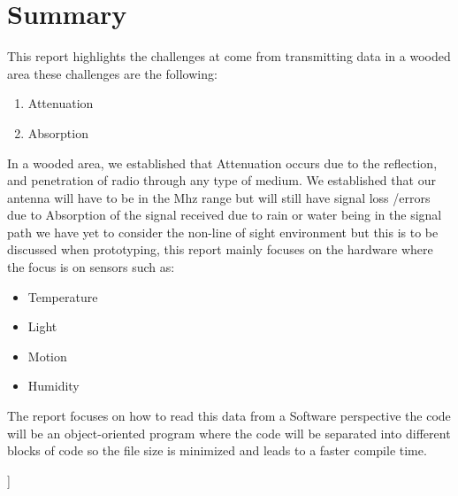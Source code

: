 \section{Summary}
This report  highlights the  challenges at come from  transmitting data in a  wooded area these challenges are  the following:
\begin{enumerate}
\item Attenuation 
\item Absorption
\end{enumerate}
In a wooded area, we established that  Attenuation occurs due to the reflection, and penetration of radio through any type of medium.
We established that our antenna will have to  be in the  Mhz range   but will still have signal loss /errors due to Absorption of  the  signal  received due  to rain or water being in the signal path
we have yet to consider the non-line of sight environment but this  is  to be  discussed when prototyping, this report mainly focuses on the hardware where the  focus is on  sensors such as:
\begin{itemize}
\item Temperature
\item Light
\item Motion
\item Humidity
\end{itemize} 
The report focuses on how to read this data from a  Software perspective the code will be an object-oriented program
where the code will be separated into different blocks of code so the file size is minimized and leads to a faster compile time. 


% 
% 

]